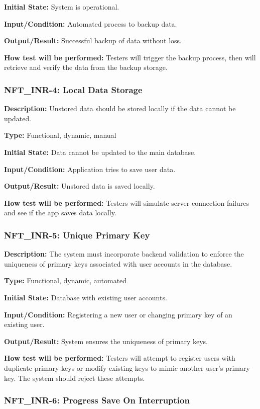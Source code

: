 \documentclass[12pt, titlepage]{article}
\begin{document}
\textbf{Initial State:} System is operational.

\textbf{Input/Condition: }Automated process to backup data.

\textbf{Output/Result:} Successful backup of data without loss.

\textbf{How test will be performed:} Testers will trigger the backup process, then will retrieve and verify the data from the backup storage.


\subsubsection*{\textbf{NFT\_INR-4: Local Data Storage}
}
\textbf{Description: }Unstored data should be stored locally if the data cannot be updated.

\textbf{Type:} Functional, dynamic, manual

\textbf{Initial State:} Data cannot be updated to the main database.

\textbf{Input/Condition: }Application tries to save user data.

\textbf{Output/Result: }Unstored data is saved locally.

\textbf{How test will be performed:} Testers will simulate server connection failures and see if the app saves data locally.


\subsubsection*{\textbf{NFT\_INR-5: Unique Primary Key}
}

\textbf{Description: }The system must incorporate backend validation to enforce the uniqueness of primary keys associated with user accounts in the database. 

\textbf{Type: }Functional, dynamic, automated

\textbf{Initial State:} Database with existing user accounts.

\textbf{Input/Condition:} Registering a new user or changing primary key of an existing user.

\textbf{Output/Result:} System ensures the uniqueness of primary keys.

\textbf{How test will be performed:} Testers will attempt to register users with duplicate primary keys or modify existing keys to mimic another user's primary key. The system should reject these attempts.


\subsubsection*{\textbf{NFT\_INR-6: Progress Save On Interruption}
}
\end{document}
